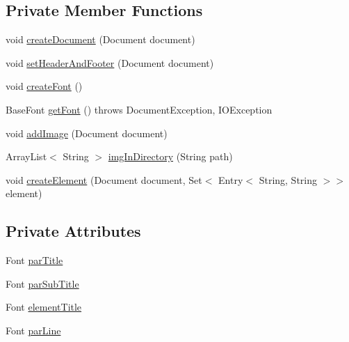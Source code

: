 \subsection*{Private Member Functions}
\begin{DoxyCompactItemize}
\item 
void \hyperlink{classit_1_1isislab_1_1masonassisteddocumentation_1_1mason_1_1control_1_1_pdf_rtf_generator_add23c0e308cdf54a3c1e3a8128ea29ed}{create\-Document} (Document document)
\item 
void \hyperlink{classit_1_1isislab_1_1masonassisteddocumentation_1_1mason_1_1control_1_1_pdf_rtf_generator_add96cb1e39ece24ace1e42aae99082a0}{set\-Header\-And\-Footer} (Document document)
\item 
void \hyperlink{classit_1_1isislab_1_1masonassisteddocumentation_1_1mason_1_1control_1_1_pdf_rtf_generator_af1f9a21f995c47a9e1a5a6f276c97852}{create\-Font} ()
\item 
Base\-Font \hyperlink{classit_1_1isislab_1_1masonassisteddocumentation_1_1mason_1_1control_1_1_pdf_rtf_generator_ae256fb15c0845470ad900c876a15fabf}{get\-Font} ()  throws Document\-Exception, I\-O\-Exception 
\item 
void \hyperlink{classit_1_1isislab_1_1masonassisteddocumentation_1_1mason_1_1control_1_1_pdf_rtf_generator_a256d403130ef860861402da49b373042}{add\-Image} (Document document)
\item 
Array\-List$<$ String $>$ \hyperlink{classit_1_1isislab_1_1masonassisteddocumentation_1_1mason_1_1control_1_1_pdf_rtf_generator_ac64a0fecc25dd00c58f569e111c06fe6}{img\-In\-Directory} (String path)
\item 
void \hyperlink{classit_1_1isislab_1_1masonassisteddocumentation_1_1mason_1_1control_1_1_pdf_rtf_generator_ad3127f275f1af4f9d92f314fb3f29f51}{create\-Element} (Document document, Set$<$ Entry$<$ String, String $>$$>$ element)
\end{DoxyCompactItemize}
\subsection*{Private Attributes}
\begin{DoxyCompactItemize}
\item 
Font \hyperlink{classit_1_1isislab_1_1masonassisteddocumentation_1_1mason_1_1control_1_1_pdf_rtf_generator_a3f130f576b5be4a3a82d7c59347c0869}{par\-Title}
\item 
Font \hyperlink{classit_1_1isislab_1_1masonassisteddocumentation_1_1mason_1_1control_1_1_pdf_rtf_generator_ae31536bac40b23df15fbb252e60c03bb}{par\-Sub\-Title}
\item 
Font \hyperlink{classit_1_1isislab_1_1masonassisteddocumentation_1_1mason_1_1control_1_1_pdf_rtf_generator_aa954332a7d987f1b6b8957fa25ee6190}{element\-Title}
\item 
Font \hyperlink{classit_1_1isislab_1_1masonassisteddocumentation_1_1mason_1_1control_1_1_pdf_rtf_generator_ae24c4a1666a5d601e16f3c3cb7a81fdb}{par\-Line}
\end{DoxyCompactItemize}
